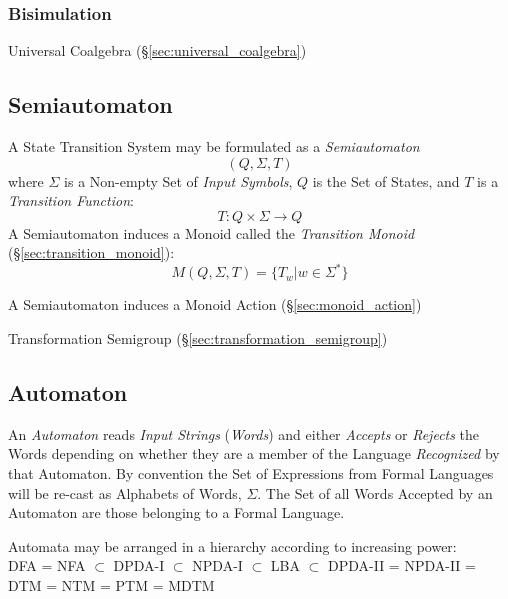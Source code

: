 \subsubsection{Bisimulation} \label{sec:bisimulation}

Universal Coalgebra (\S\ref{sec:universal_coalgebra})



\subsection{Semiautomaton}\label{sec:semiautomaton}

A State Transition System may be formulated as a \emph{Semiautomaton}
\[
  (Q,\Sigma,T)
\]
where $\Sigma$ is a Non-empty Set of \emph{Input Symbols}, $Q$ is the
Set of States, and $T$ is a \emph{Transition Function}:
\[
  T:Q \times \Sigma \rightarrow Q
\]
A Semiautomaton induces a Monoid called the \emph{Transition Monoid}
(\S\ref{sec:transition_monoid}):
\[
  M(Q,\Sigma,T) = \{T_w | w \in \Sigma^*\}
\]

A Semiautomaton induces a Monoid Action (\S\ref{sec:monoid_action})

Transformation Semigroup (\S\ref{sec:transformation_semigroup})




\subsection{Automaton} \label{sec:automaton}

An \emph{Automaton} reads \emph{Input Strings} (\emph{Words}) and
either \emph{Accepts} or \emph{Rejects} the Words depending on whether
they are a member of the Language \emph{Recognized} by that Automaton.
By convention the Set of Expressions from Formal Languages will be
re-cast as Alphabets of Words, $\Sigma$. The Set of all Words Accepted
by an Automaton are those belonging to a Formal Language.

Automata may be arranged in a hierarchy according to increasing
power:\\
DFA = NFA $\subset$ DPDA-I $\subset$ NPDA-I $\subset$ LBA
$\subset$ DPDA-II = NPDA-II = DTM = NTM = PTM = MDTM


